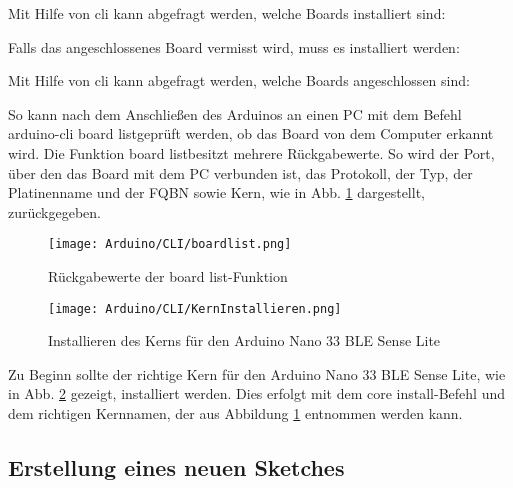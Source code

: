Mit Hilfe von \ac{cli} kann abgefragt werden, welche Boards installiert sind:

\medskip



\medskip

Falls das angeschlossenes Board vermisst wird, muss es installiert werden:

\medskip


\medskip

Mit Hilfe von \ac{cli} kann abgefragt werden, welche Boards angeschlossen sind:

\medskip





So kann nach dem Anschließen des Arduinos an einen PC mit dem Befehl \glqq arduino-cli board list\grqq geprüft werden, ob das Board von dem Computer erkannt wird. Die Funktion \glqq board list\grqq besitzt mehrere Rückgabewerte. So wird der Port, über den das Board mit dem PC verbunden ist, das Protokoll, der Typ, der Platinenname und der FQBN sowie Kern, wie in Abb. \ref{DBboardlist} dargestellt, zurückgegeben.

\begin{figure}[h]
    \begin{center}
        \texttt{[image: Arduino/CLI/boardlist.png]}
        \caption{Rückgabewerte der \glqq board list\grqq-Funktion}
        \label{DBboardlist}
    \end{center}
\end{figure}

\begin{figure}[h]
    \begin{center}
        \texttt{[image: Arduino/CLI/KernInstallieren.png]}
        \caption{Installieren des Kerns für den Arduino Nano 33 BLE Sense Lite}
        \label{KernInstallieren}
    \end{center}
\end{figure}


Zu Beginn sollte der richtige Kern für den Arduino Nano 33 BLE Sense Lite, wie in Abb. \ref{KernInstallieren} gezeigt, installiert werden. Dies erfolgt mit dem \glqq core install\grqq{}-Befehl und dem richtigen Kernnamen, der aus Abbildung \ref{DBboardlist} entnommen werden kann.


\subsection{Erstellung eines neuen Sketches}

